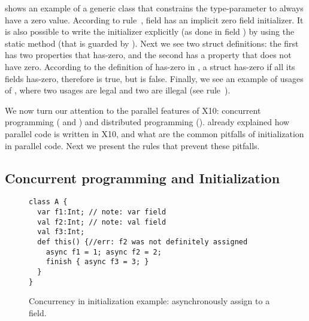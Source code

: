  shows an example of a generic class 
    that constrains the type-parameter  to always have a zero value.
According to rule~, field  has an implicit zero field initializer.
It is also possible to write the initializer explicitly (as done in field ) by using the static method 
    (that is guarded by ).
Next we see two struct definitions:
    the first has two properties that has-zero,
    and the second has a property that does not have zero.
According to the definition of has-zero in ,
    a struct has-zero if all its fields has-zero,
    therefore  is true, but
     is false.
Finally, we see an example of usages of ,
    where two usages are legal and two are illegal
    (see rule~).







We now turn our attention to the parallel features of X10:
    concurrent programming ( and )
    and distributed programming ().
 already explained how parallel code is written in X10,
    and what are the common pitfalls of initialization in parallel code.
Next we present the rules that prevent these pitfalls.

\subsection{Concurrent programming and Initialization}


\begin{figure}
\begin{lstlisting}
class A {
  var f1:Int; // note: var field
  val f2:Int; // note: val field
  val f3:Int;
  def this() {//err: f2 was not definitely assigned
    async f1 = 1; async f2 = 2;
    finish { async f3 = 3; }
  }
}
\end{lstlisting}
\caption{Concurrency in initialization example: asynchronously assign to a field.
    }
\label{Figure:Asynchronously-init}
\end{figure}


